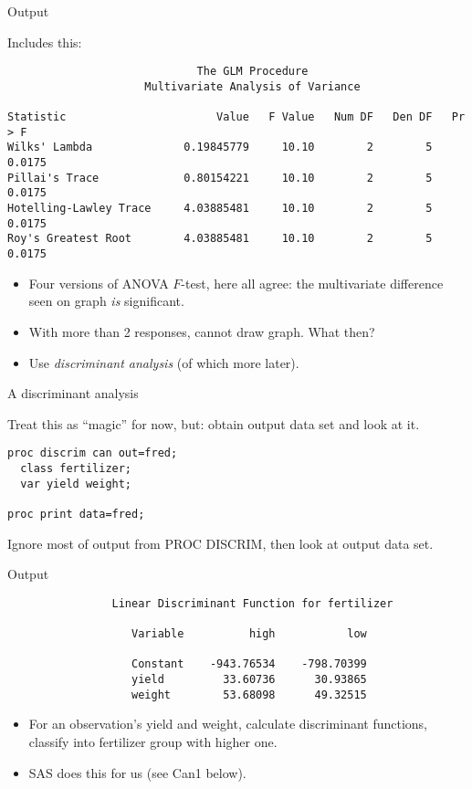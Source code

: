 \documentclass[pdf]{prosper}
\begin{document}
\begin{slide}{Output}

Includes this:

{\scriptsize
\begin{verbatim}
                             The GLM Procedure
                     Multivariate Analysis of Variance

Statistic                       Value   F Value   Num DF   Den DF   Pr > F
Wilks' Lambda              0.19845779     10.10        2        5   0.0175
Pillai's Trace             0.80154221     10.10        2        5   0.0175
Hotelling-Lawley Trace     4.03885481     10.10        2        5   0.0175
Roy's Greatest Root        4.03885481     10.10        2        5   0.0175

\end{verbatim}
}

\begin{itemize}
\item 
Four versions of ANOVA $F$-test, here all agree: the multivariate difference seen on graph {\em is} significant. 
\item With more than 2 responses, cannot draw graph. What then? 
\item Use {\em discriminant analysis} (of which more later).
\end{itemize}
  
\end{slide}

\begin{slide}{A discriminant analysis}

Treat this as ``magic'' for now, but: obtain output data set and look at it.

\begin{verbatim}
proc discrim can out=fred;
  class fertilizer;
  var yield weight;

proc print data=fred;

\end{verbatim}

Ignore most of output from PROC DISCRIM, then look at output data set.

\end{slide}

\begin{slide}{Output}

{\scriptsize
\begin{verbatim}
                Linear Discriminant Function for fertilizer
 
                   Variable          high           low

                   Constant    -943.76534    -798.70399
                   yield         33.60736      30.93865
                   weight        53.68098      49.32515
\end{verbatim}
}

\begin{itemize}
\item For an observation's yield and weight, calculate discriminant functions, classify into fertilizer group with higher one.
\item SAS does this for us (see Can1 below).
\end{itemize}

\end{slide}
\end{document}
